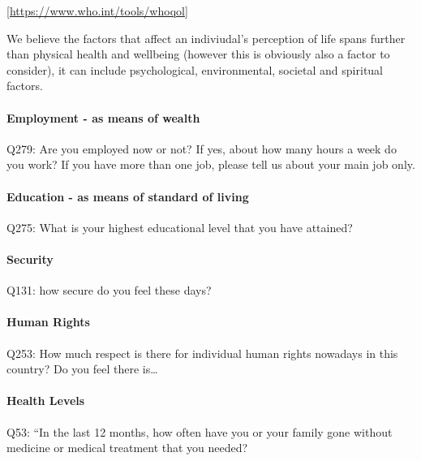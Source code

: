 \documentclass[
]{article}
\begin{document}
{[}\url{https://www.who.int/tools/whoqol}{]}

We believe the factors that affect an indiviudal's perception of life
spans further than physical health and wellbeing (however this is
obviously also a factor to consider), it can include psychological,
environmental, societal and spiritual factors.

\hypertarget{employment---as-means-of-wealth}{%
\paragraph{Employment - as means of
wealth}\label{employment---as-means-of-wealth}}

Q279: Are you employed now or not? If yes, about how many hours a week
do you work? If you have more than one job, please tell us about your
main job only.

\hypertarget{education---as-means-of-standard-of-living}{%
\paragraph{Education - as means of standard of
living}\label{education---as-means-of-standard-of-living}}

Q275: What is your highest educational level that you have attained?

\hypertarget{security}{%
\paragraph{Security}\label{security}}

Q131: how secure do you feel these days?

\hypertarget{human-rights}{%
\paragraph{Human Rights}\label{human-rights}}

Q253: How much respect is there for individual human rights nowadays in
this country? Do you feel there is\ldots{}

\hypertarget{health-levels}{%
\paragraph{Health Levels}\label{health-levels}}

Q53: ``In the last 12 months, how often have you or your family gone
without medicine or medical treatment that you needed?
\end{document}
